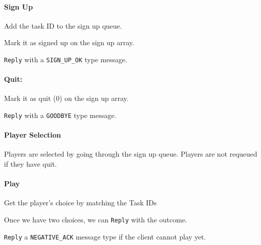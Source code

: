 \documentclass[letterpaper, 11pt]{article}
\begin{document}
\paragraph{Sign Up%
  \label{sign-up}%
}
\setcounter{listcnt0}{0}
\begin{list}{.}
{
\setlength{\rightmargin}{\leftmargin}
}

\item Add the task ID to the sign up queue.

\item Mark it as signed up on the sign up array.

\item \texttt{Reply} with a \texttt{SIGN\_UP\_OK} type message.
\end{list}


\paragraph{Quit:%
  \label{quit}%
}
\setcounter{listcnt0}{0}
\begin{list}{.}
{
\setlength{\rightmargin}{\leftmargin}
}

\item Mark it as quit (0) on the sign up array.

\item \texttt{Reply} with a \texttt{GOODBYE} type message.
\end{list}


\paragraph{Player Selection%
  \label{player-selection}%
}

Players are selected by going through the sign up queue. Players are not requeued if they have quit.


\paragraph{Play%
  \label{play}%
}
\setcounter{listcnt0}{0}
\begin{list}{.}
{
\setlength{\rightmargin}{\leftmargin}
}

\item Get the player's choice by matching the Task IDs

\item Once we have two choices, we can \texttt{Reply} with the outcome.

\item \texttt{Reply} a \texttt{NEGATIVE\_ACK} message type if the client cannot play yet.
\end{list}
\end{document}
